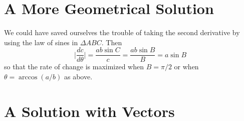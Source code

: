 \documentclass{ximera}
\begin{document}
\section*{A More Geometrical Solution}
We could have saved ourselves the trouble of taking the second derivative by using the law of sines in $\Delta ABC$. Then %
\[
    \Big| \frac{dc}{d\theta}  \Big| =   \frac{ab\sin C}{c}  = \frac{ab \sin B}{B} = a\sin B
\]
so that the rate of change is maximized when $B = \pi/2$ or when $\theta = \arccos(a/b)$ as above.



\section*{A Solution with Vectors}
\end{document}
